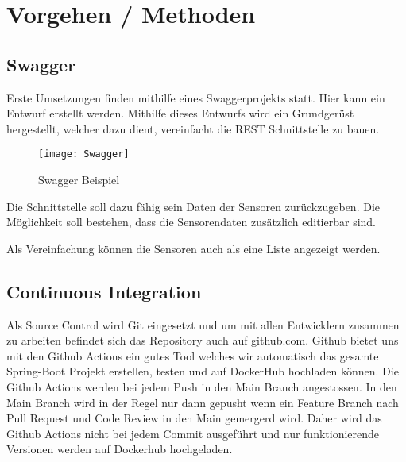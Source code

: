 \documentclass[../main.tex]{subfiles}
\begin{document}
	\section{Vorgehen / Methoden}
	
	\subsection{Swagger}
	Erste Umsetzungen finden mithilfe eines Swaggerprojekts statt. Hier kann ein Entwurf erstellt werden. Mithilfe dieses Entwurfs wird ein Grundgerüst hergestellt, welcher dazu dient, vereinfacht die REST Schnittstelle zu bauen.
	
	\begin{figure}[h]
		\centering
		\texttt{[image: Swagger]}
		\caption{Swagger Beispiel}
		\label{fig:Swagger}
	\end{figure}
	
	Die Schnittstelle soll dazu fähig sein Daten der Sensoren zurückzugeben. Die Möglichkeit soll bestehen, dass die Sensorendaten zusätzlich editierbar sind.
	
	Als Vereinfachung können die Sensoren auch als eine Liste angezeigt werden.
	
	\subsection{Continuous Integration}
	Als Source Control wird Git eingesetzt und um mit allen Entwicklern zusammen zu arbeiten befindet sich das Repository auch auf github.com. Github bietet uns mit den Github Actions ein gutes Tool welches wir automatisch das gesamte Spring-Boot Projekt erstellen, testen und auf DockerHub hochladen können. Die Github Actions werden bei jedem Push in den Main Branch angestossen. In den Main Branch wird in der Regel nur dann gepusht wenn ein Feature Branch nach Pull Request und Code Review in den Main gemergerd wird. Daher wird das Github Actions nicht bei jedem Commit ausgeführt und nur funktionierende Versionen werden auf Dockerhub hochgeladen.
	
\end{document}
